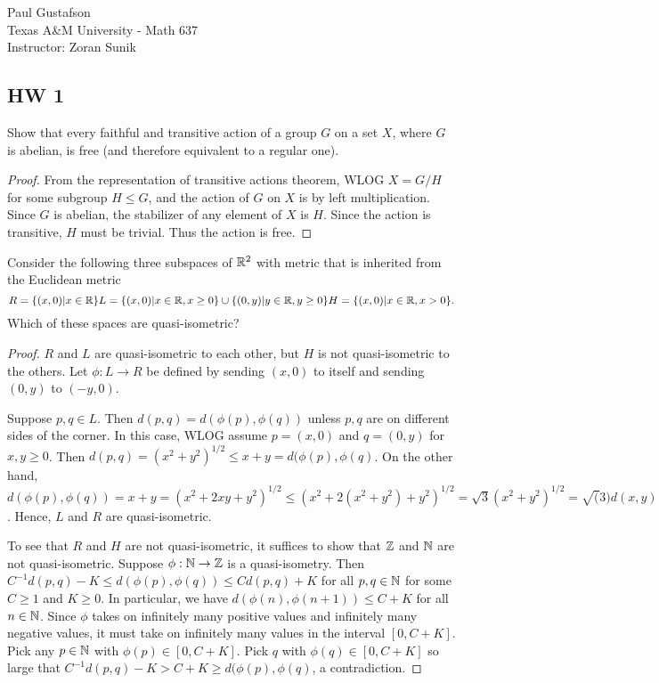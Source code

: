 \documentclass{article}
\begin{document}
\noindent Paul Gustafson\\
\noindent Texas A\&M University - Math 637\\ 
\noindent Instructor: Zoran Sunik

\subsection*{HW 1}
  Show that every faithful and transitive action of a group $G$ on a set $X$, where $G$ is abelian, is free (and therefore equivalent to a regular one).
\begin{proof}
From the representation of transitive actions theorem, WLOG $X = G/H$ for some subgroup $H \le G$, and the action of $G$ on $X$ is by left multiplication.
Since $G$ is abelian, the stabilizer of any element of $X$ is $H$. Since the action is transitive, $H$ must be trivial. Thus the action is free.
\end{proof}

 Consider the following three subspaces of $\mathbb{R}^2$ with metric that is inherited from the Euclidean metric
$$
R = \{ (x,0) | x \in \mathbb{R} \}
\\
L = \{ (x,0) | x \in \mathbb{R}, x \ge 0\} \cup \{(0,y) | y \in \mathbb{R}, y \ge 0 \}
\\
H = \{ (x, 0) | x \in \mathbb{R}, x > 0 \}.
$$
Which of these spaces are quasi-isometric?
\begin{proof}
$R$ and $L$ are quasi-isometric to each other, but $H$ is not quasi-isometric to the others.
Let $\phi: L \to R$ be defined by sending $(x,0)$ to itself and sending $(0,y)$ to $(-y,0)$.

Suppose $p,q \in L$.  Then $d(p,q) = d(\phi(p), \phi(q))$ unless $p,q$ are on different sides of the corner.
In this case, WLOG assume $p = (x,0)$ and $q = (0,y)$ for $x,y \ge 0$.  Then $d(p,q) = (x^2 + y^2)^{1/2} \le x + y = d(\phi(p), \phi(q)$.
On the other hand, $d(\phi(p), \phi(q)) = x + y = (x^2 + 2xy + y^2)^{1/2} \le (x^2 + 2(x^2 + y^2) + y^2)^{1/2} =  \sqrt{3} (x^2 + y^2)^{1/2} = \sqrt(3) d(x,y)$.
Hence, $L$ and $R$ are quasi-isometric.

To see that $R$ and $H$ are not quasi-isometric, it suffices to show that $\mathbb{Z}$ and $\mathbb{N}$ are not quasi-isometric. Suppose $\phi: \mathbb{N} \to \mathbb{Z}$ is a quasi-isometry. Then $C^{-1} d(p,q) - K \le d(\phi(p), \phi(q)) \le C d(p,q) + K$ for all $p,q \in \mathbb{N}$ for some $C \ge 1$ and $K \ge 0$.  In particular, we have $d(\phi(n), \phi(n+1)) \le C + K$ for all $n \in \mathbb{N}$. Since $\phi$ takes on infinitely many positive values and infinitely many negative values, it must take on infinitely many values in the interval $[0, C+K]$. Pick any $p \in \mathbb{N}$ with $\phi(p) \in [0, C+K]$.  Pick $q$ with $\phi(q) \in [0, C+K]$ so large that $C^{-1} d(p,q) - K > C+K  \ge d(\phi(p), \phi(q)$, a contradiction.
\end{proof}
\end{document}
